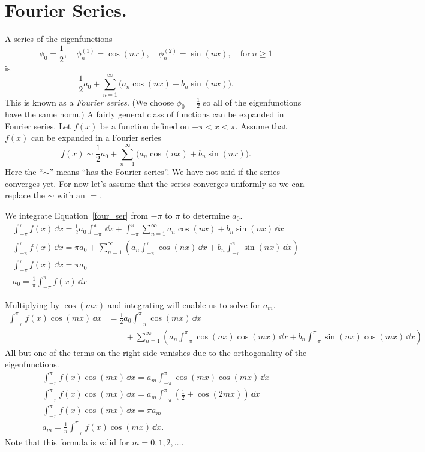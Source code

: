 \section{Fourier Series.}





A series of the eigenfunctions
\[
\phi_0 = \frac{1}{2}, \quad \phi_n^{(1)} = \cos(n x), 
\quad \phi_n^{(2)} = \sin(n x), \quad \mathrm{for}\ n \geq 1
\]
is
\[ 
\frac{1}{2} a_0 + \sum_{n=1}^\infty 
\big(a_n \cos(n x) + b_n \sin(n x)\big).
\]
This is known as a \textit{Fourier series}.
(We choose $\phi_0 = \frac{1}{2}$ so all of the eigenfunctions have the same norm.)
A fairly general class of functions can be expanded in Fourier series.  
Let $f(x)$ be a function defined on $-\pi < x < \pi$.
Assume that $f(x)$ can be expanded in a Fourier series
\begin{equation} \label{four_ser}
  f(x) \sim \frac{1}{2} a_0 + \sum_{n=1}^\infty 
  \big(a_n \cos(n x) + b_n \sin(n x)\big).
\end{equation}
Here the ``$\sim$'' means ``has the Fourier series''.  We have not said
if the series converges yet.  For now let's assume that the series 
converges uniformly so we can replace the $\sim$ with an $=$.  

We integrate Equation~\ref{four_ser} from $-\pi$ to $\pi$ to determine $a_0$.
\begin{gather*}
  \int_{-\pi}^\pi f(x)\,\dd x = \frac{1}{2}a_0 \int_{-\pi}^\pi\,\dd x
  + \int_{-\pi}^\pi \sum_{n=1}^\infty a_n \cos(n x) 
  + b_n \sin(n x)\,\dd x\\
  \int_{-\pi}^\pi f(x)\,\dd x = \pi a_0 + \sum_{n=1}^\infty \left(
    a_n \int_{-\pi}^\pi \cos(n x)\,\dd x 
    + b_n \int_{-\pi}^\pi \sin(n x)\,\dd x \right) \\
  \int_{-\pi}^\pi f(x)\,\dd x = \pi a_0 \\
  a_0 = \frac{1}{\pi} \int_{-\pi}^\pi f(x)\,\dd x 
\end{gather*} 

Multiplying by $\cos(m x)$ and integrating will enable us to solve for $a_m$.
\begin{align*}
  \int_{-\pi}^\pi f(x) \cos(m x)\,\dd x &= 
  \frac{1}{2}a_0 \int_{-\pi}^\pi \cos(m x)\,\dd x \\
  &\qquad 
  + \sum_{n=1}^\infty \left(a_n \int_{-\pi}^\pi \cos(n x) \cos(m x)\,\dd x
    + b_n \int_{-\pi}^\pi \sin(n x) \cos(m x)\,\dd x \right) 
\end{align*}
All but one of the terms on the right side vanishes due to the 
orthogonality of the eigenfunctions.
\begin{gather*}
  \int_{-\pi}^\pi f(x) \cos(m x)\,\dd x = 
  a_m \int_{-\pi}^\pi \cos(m x) \cos(m x)\,\dd x \\
  \int_{-\pi}^\pi f(x) \cos(m x)\,\dd x = a_m \int_{-\pi}^\pi \left( \frac{1}{2}
    + \cos(2m x) \right)\,\dd x \\
  \int_{-\pi}^\pi f(x) \cos(m x)\,\dd x = \pi a_m \\
  a_m = \frac{1}{\pi} \int_{-\pi}^\pi f(x) \cos(m x)\,\dd x.
\end{gather*}
Note that this formula is valid for $m = 0, 1, 2, \ldots$.

